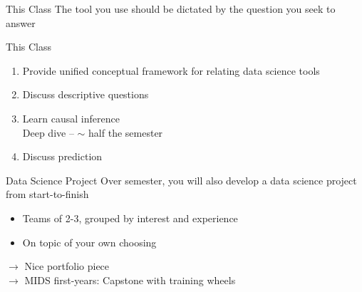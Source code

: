 \documentclass[11pt]{beamer}
\begin{document}
\begin{frame}[c]{This Class}
The tool you use should be dictated by the question you seek to answer
\end{frame}

\begin{frame}[c]{This Class}
\begin{enumerate}
  \item Provide unified conceptual framework for relating data science tools\\
  \item Discuss descriptive questions \\
  \item Learn causal inference \\
  {\color{gray} Deep dive -- $\sim$ half the semester}
  \item Discuss prediction \\
\end{enumerate}
\end{frame}

\begin{frame}[c]{Data Science Project}
Over semester, you will also develop a data science project from start-to-finish
\begin{itemize}
  \item Teams of 2-3, grouped by interest and experience
  \item On topic of your own choosing
\end{itemize}
\pause $\rightarrow$ Nice portfolio piece\\
\pause $\rightarrow$ MIDS first-years: Capstone with training wheels
\end{frame}
\end{document}
